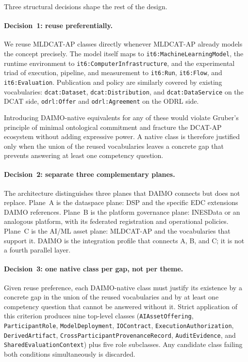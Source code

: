 \documentclass[Afour,sagev,times]{sagej}
\newcommand{\code}[1]{\texttt{#1}}
\begin{document}
Three structural decisions shape the rest of the design.

\paragraph{Decision~1: reuse preferentially.} We reuse MLDCAT-AP classes directly whenever MLDCAT-AP already models the concept precisely. The model itself maps to \code{it6:MachineLearningModel}, the runtime environment to \code{it6:ComputerInfrastructure}, and the experimental triad of execution, pipeline, and measurement to \code{it6:Run}, \code{it6:Flow}, and \code{it6:Evaluation}. Publication and policy are similarly covered by existing vocabularies: \code{dcat:Dataset}, \code{dcat:Distribution}, and \code{dcat:DataService} on the DCAT side, \code{odrl:Offer} and \code{odrl:Agreement} on the ODRL side.

Introducing DAIMO-native equivalents for any of these would violate Gruber's principle of minimal ontological commitment and fracture the DCAT-AP ecosystem without adding expressive power. A native class is therefore justified only when the union of the reused vocabularies leaves a concrete gap that prevents answering at least one competency question.

\paragraph{Decision~2: separate three complementary planes.} The architecture distinguishes three planes that DAIMO connects but does not replace. Plane~A is the dataspace plane: DSP and the specific EDC extensions DAIMO references. Plane~B is the platform governance plane: INESData or an analogous platform, with its federated registration and operational policies. Plane~C is the AI/ML asset plane: MLDCAT-AP and the vocabularies that support it. DAIMO is the integration profile that connects A, B, and C; it is not a fourth parallel layer.

\paragraph{Decision~3: one native class per gap, not per theme.} Given reuse preference, each DAIMO-native class must justify its existence by a concrete gap in the union of the reused vocabularies and by at least one competency question that cannot be answered without it. Strict application of this criterion produces nine top-level classes (\code{AIAssetOffering}, \code{ParticipantRole}, \code{ModelDeployment}, \code{IOContract}, \code{ExecutionAuthorization}, \code{DerivedArtifact}, \code{CrossParticipantProvenanceRecord}, \code{AuditEvidence}, and \code{SharedEvaluationContext}) plus five role subclasses. Any candidate class failing both conditions simultaneously is discarded.
\end{document}
